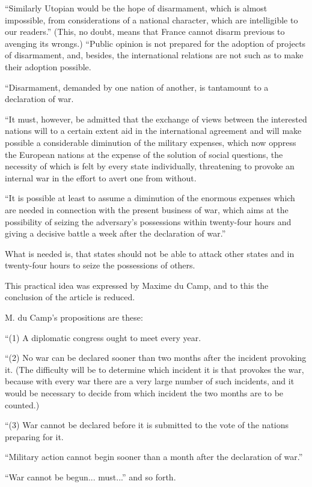 \documentclass{book}
\begin{document}
“Similarly Utopian would be the hope of disarmament, which is almost impossible, from considerations of a national character, which are intelligible to our readers.” (This, no doubt, means that France cannot disarm previous to avenging its wrongs.) “Public opinion is not prepared for the adoption of projects of disarmament, and, besides, the international relations are not such as to make their adoption possible.

“Disarmament, demanded by one nation of another, is tantamount to a declaration of war.

“It must, however, be admitted that the exchange of views between the interested nations will to a certain extent aid in the international agreement and will make possible a considerable diminution of the military expenses, which now oppress the European nations at the expense of the solution of social questions, the necessity of which is felt by every state individually, threatening to provoke an internal war in the effort to avert one from without.

“It is possible at least to assume a diminution of the enormous expenses which are needed in connection with the present business of war, which aims at the possibility of seizing the adversary’s possessions within twenty-four hours and giving a decisive battle a week after the declaration of war.”

What is needed is, that states should not be able to attack other states and in twenty-four hours to seize the possessions of others.

This practical idea was expressed by Maxime du Camp, and to this the conclusion of the article is reduced.

M. du Camp’s propositions are these:

“(1) A diplomatic congress ought to meet every year.

“(2) No war can be declared sooner than two months after the incident provoking it. (The difficulty will be to determine which incident it is that provokes the war, because with every war there are a very large number of such incidents, and it would be necessary to decide from which incident the two months are to be counted.)

“(3) War cannot be declared before it is submitted to the vote of the nations preparing for it.

“Military action cannot begin sooner than a month after the declaration of war.”

“War cannot be begun... must...” and so forth.
\end{document}

